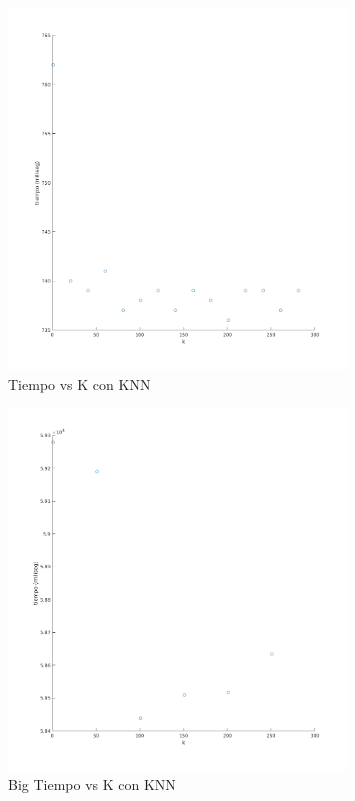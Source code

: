 \begin{figure}[H]
	\centering	\includegraphics[width=0.8\textwidth]{img/k_knn_tiempo.png}
	\caption{Tiempo vs K con KNN}
	\label{fig:K vs Tiempo con KNN}
\end{figure}
\begin{figure}[H]
	\centering	\includegraphics[width=0.8\textwidth]{img/big_k_knn_tiempo.png}
	\caption{Big Tiempo vs K con KNN}
	\label{fig:Big K vs Tiempo con KNN}
\end{figure}





